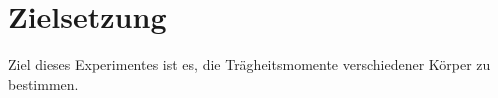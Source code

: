 \section{Zielsetzung}
\label{sec:Zielsetzung}
Ziel dieses Experimentes ist es, die Trägheitsmomente verschiedener Körper zu bestimmen. 